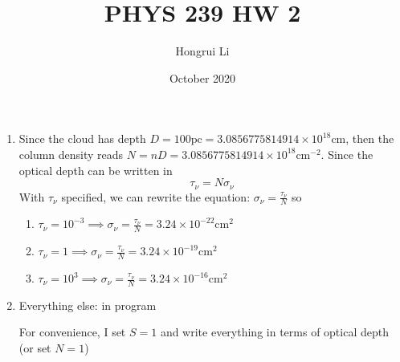 \documentclass[14pt]{article}
\title{\Large{PHYS 239   HW 2}}
\author{Hongrui Li}
\date{October 2020}
\begin{document}
\maketitle
\begin{enumerate}
    \item Since the cloud has depth $D=100 \text{pc}=3.0856775814914\times 10^{18} \text{cm}$, then the column density reads $N=nD=3.0856775814914\times 10^{18} \text{cm}^{-2}$. Since the optical depth can be written in
    $$\tau_\nu=N\sigma_\nu$$
    With $\tau_\nu$ specified, we can rewrite the equation: $\sigma_\nu=\frac{\tau_\nu}{N}$ so
    \begin{enumerate}
        \item $\tau_\nu=10^{-3}\implies \sigma_\nu=\frac{\tau_\nu}{N}=3.24\times 10^{-22}\text{cm}^2$
        
        \item $\tau_\nu=1\implies \sigma_\nu=\frac{\tau_\nu}{N}=3.24\times 10^{-19}\text{cm}^2$
        
        \item $\tau_\nu=10^{3}\implies \sigma_\nu=\frac{\tau_\nu}{N}=3.24\times 10^{-16}\text{cm}^2$
    \end{enumerate}

    \item Everything else: in program 
    
    For convenience, I set $S=1$ and write everything in terms of optical depth (or set $N=1$)
\end{enumerate}
\end{document}
